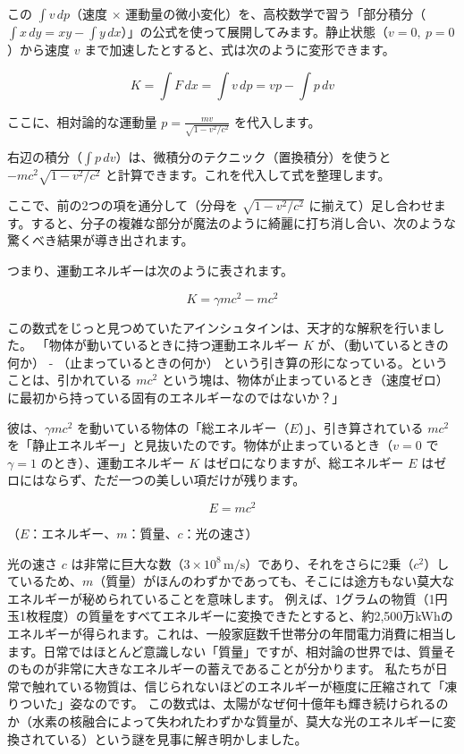 この \ensuremath{\int v \, dp}（速度 \ensuremath{\times} 運動量の微小変化）を、高校数学で習う「部分積分（\ensuremath{\int x \, dy = xy - \int y \, dx}）」の公式を使って展開してみます。静止状態（\(v=0,\ p=0\)）から速度 \(v\) まで加速したとすると、式は次のように変形できます。

\[
K=\int F\,dx=\int v\,dp = vp-\int p\,dv
\]

ここに、相対論的な運動量 \(p = \frac{mv}{\sqrt{1-v^2/c^2}}\) を代入します。

右辺の積分（\ensuremath{\int p \, dv}）は、微積分のテクニック（置換積分）を使うと \(-mc^2\sqrt{1-v^2/c^2}\) と計算できます。これを代入して式を整理します。

ここで、前の2つの項を通分して（分母を \ensuremath{\sqrt{1-v^2/c^2}} に揃えて）足し合わせます。すると、分子の複雑な部分が魔法のように綺麗に打ち消し合い、次のような驚くべき結果が導き出されます。

つまり、運動エネルギーは次のように表されます。

\[
K=\gamma mc^2-mc^2
\]

この数式をじっと見つめていたアインシュタインは、天才的な解釈を行いました。 「物体が動いているときに持つ運動エネルギー \(K\) が、（動いているときの何か） - （止まっているときの何か） という引き算の形になっている。ということは、引かれている \ensuremath{mc^2} という塊は、物体が止まっているとき（速度ゼロ）に最初から持っている固有のエネルギーなのではないか？」

彼は、\ensuremath{\gamma mc^2} を動いている物体の「総エネルギー（\(E\)）」、引き算されている \ensuremath{mc^2} を「静止エネルギー」と見抜いたのです。物体が止まっているとき（\(v=0\) で \ensuremath{\gamma=1} のとき）、運動エネルギー \(K\) はゼロになりますが、総エネルギー \(E\) はゼロにはならず、ただ一つの美しい項だけが残ります。

\[
E=mc^2
\]

（\(E\)：エネルギー、\(m\)：質量、\(c\)：光の速さ）

光の速さ \(c\) は非常に巨大な数（\(3 \times 10^{8}\,\mathrm{m/s}\)）であり、それをさらに2乗（\ensuremath{c^2}）しているため、\(m\)（質量）がほんのわずかであっても、そこには途方もない莫大なエネルギーが秘められていることを意味します。 
例えば、1グラムの物質（1円玉1枚程度）の質量をすべてエネルギーに変換できたとすると、約2,500万kWhのエネルギーが得られます。これは、一般家庭数千世帯分の年間電力消費に相当します。日常ではほとんど意識しない「質量」ですが、相対論の世界では、質量そのものが非常に大きなエネルギーの蓄えであることが分かります。
私たちが日常で触れている物質は、信じられないほどのエネルギーが極度に圧縮されて「凍りついた」姿なのです。 この数式は、太陽がなぜ何十億年も輝き続けられるのか（水素の核融合によって失われたわずかな質量が、莫大な光のエネルギーに変換されている）という謎を見事に解き明かしました。

